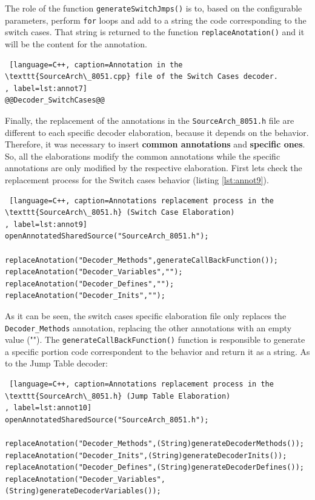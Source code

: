 \documentclass[12pt]{article}
\begin{document}
{The role of the function \texttt{generateSwitchJmps()} is to, based on the configurable parameters, perform \texttt{for} loops and add to a string the code corresponding to the switch cases. That string is returned to the function \texttt{replaceAnotation()} and it will be the content for the annotation.

\begin{lstlisting} [language=C++, caption=Annotation in the \texttt{SourceArch\_8051.cpp} file of the Switch Cases decoder.
, label=lst:annot7]
@@Decoder_SwitchCases@@
\end{lstlisting}


Finally, the replacement of the annotations in the \texttt{SourceArch\_8051.h} file are different to each specific decoder elaboration, because it depends on the behavior. Therefore, it was necessary to insert \textbf{common annotations} and \textbf{specific ones}. So, all the elaborations modify the common annotations while the specific annotations are only modified by the respective elaboration. First lets check the replacement process for the Switch cases behavior (listing \ref{lst:annot9}).

\begin{lstlisting} [language=C++, caption=Annotations replacement process in the \texttt{SourceArch\_8051.h} (Switch Case Elaboration)
, label=lst:annot9]
openAnnotatedSharedSource("SourceArch_8051.h");

replaceAnotation("Decoder_Methods",generateCallBackFunction());
replaceAnotation("Decoder_Variables","");
replaceAnotation("Decoder_Defines","");
replaceAnotation("Decoder_Inits","");
\end{lstlisting}

As it can be seen, the switch cases specific elaboration file only replaces the \texttt{Decoder\_Methods} annotation, replacing the other annotations with an empty value (""). The \texttt{generateCallBackFunction()} function is responsible to generate a specific portion code correspondent to the behavior and return it as a string. As to the Jump Table decoder: 

\begin{lstlisting} [language=C++, caption=Annotations replacement process in the \texttt{SourceArch\_8051.h} (Jump Table Elaboration)
, label=lst:annot10]
openAnnotatedSharedSource("SourceArch_8051.h");
		
replaceAnotation("Decoder_Methods",(String)generateDecoderMethods());
replaceAnotation("Decoder_Inits",(String)generateDecoderInits());
replaceAnotation("Decoder_Defines",(String)generateDecoderDefines());
replaceAnotation("Decoder_Variables",(String)generateDecoderVariables());
\end{lstlisting}

}
\end{document}
